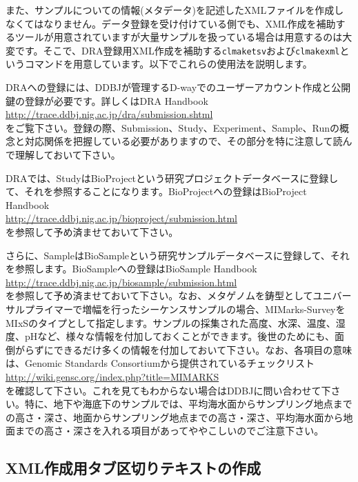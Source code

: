 \documentclass[titlepage,10pt,a4paper]{jsbook}
\begin{document}
また、サンプルについての情報(メタデータ)を記述したXMLファイルを作成しなくてはなりません。データ登録を受け付けている側でも、XML作成を補助するツールが用意されていますが大量サンプルを扱っている場合は用意するのは大変です。そこで、DRA登録用XML作成を補助する\texttt{clmaketsv}および\texttt{clmakexml}というコマンドを用意しています。以下でこれらの使用法を説明します。

DRAへの登録には、DDBJが管理するD-wayでのユーザーアカウント作成と公開鍵の登録が必要です。詳しくはDRA Handbook\\
\href{http://trace.ddbj.nig.ac.jp/dra/submission.shtml}{http://trace.ddbj.nig.ac.jp/dra/submission.shtml}\\
をご覧下さい。登録の際、Submission、Study、Experiment、Sample、Runの概念と対応関係を把握している必要がありますので、その部分を特に注意して読んで理解しておいて下さい。

DRAでは、StudyはBioProjectという研究プロジェクトデータベースに登録して、それを参照することになります。BioProjectへの登録はBioProject Handbook\\
\href{http://trace.ddbj.nig.ac.jp/bioproject/submission.html}{http://trace.ddbj.nig.ac.jp/bioproject/submission.html}\\
を参照して予め済ませておいて下さい。

さらに、SampleはBioSampleという研究サンプルデータベースに登録して、それを参照します。BioSampleへの登録はBioSample Handbook\\
\href{http://trace.ddbj.nig.ac.jp/biosample/submission.html}{http://trace.ddbj.nig.ac.jp/biosample/submission.html}\\
を参照して予め済ませておいて下さい。なお、メタゲノムを鋳型としてユニバーサルプライマーで増幅を行ったシーケンスサンプルの場合、MIMarks-SurveyをMIxSのタイプとして指定します。サンプルの採集された高度、水深、温度、湿度、pHなど、様々な情報を付加しておくことができます。後世のためにも、面倒がらずにできるだけ多くの情報を付加しておいて下さい。なお、各項目の意味は、Genomic Standards Consortiumから提供されているチェックリスト\\
\href{http://wiki.gensc.org/index.php?title=MIMARKS}{http://wiki.gensc.org/index.php?title=MIMARKS}\\
を確認して下さい。これを見てもわからない場合はDDBJに問い合わせて下さい。特に、地下や海底下のサンプルでは、平均海水面からサンプリング地点までの高さ・深さ、地面からサンプリング地点までの高さ・深さ、平均海水面から地面までの高さ・深さを入れる項目があってややこしいのでご注意下さい。

\subsection{XML作成用タブ区切りテキストの作成}
\end{document}
